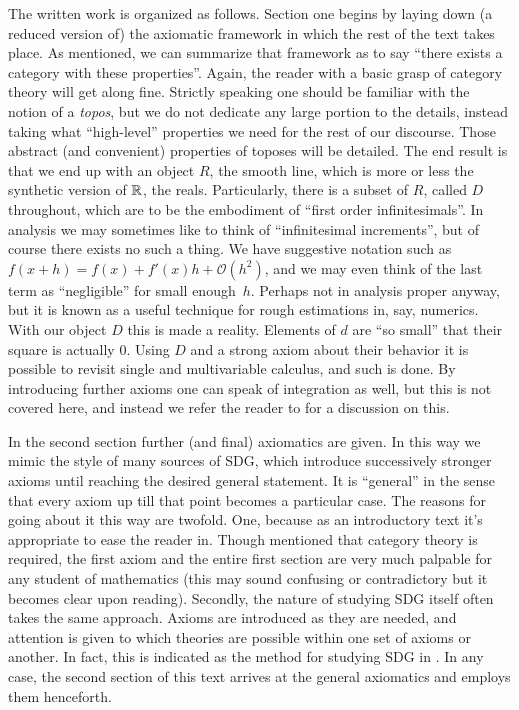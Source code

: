 The written work is organized as follows. Section one begins by laying down (a reduced version of) the axiomatic framework in which the rest of the text takes place. As mentioned, we can summarize that framework as to say ``there exists a category with these properties''. Again, the reader with a basic grasp of category theory will get along fine. Strictly speaking one should be familiar with the notion of a \emph{topos}, but we do not dedicate any large portion to the details, instead taking what ``high-level'' properties we need for the rest of our discourse. Those abstract (and convenient) properties of toposes will be detailed. The end result is that we end up with an object \( R \), the smooth line, which is more or less the synthetic version of \( \mathbb{R} \), the reals. Particularly, there is a subset of \( R \), called \( D \) throughout, which are to be the embodiment of ``first order infinitesimals''. In analysis we may sometimes like to think of ``infinitesimal increments'', but of course there exists no such a thing. We have suggestive notation such as \( f(x+h) = f(x) + f'(x)h + \mathcal O(h^2) \), and we may even think of the last term as ``negligible'' for small enough~\( h \). Perhaps not in analysis proper anyway, but it is known as a useful technique for rough estimations in, say, numerics. With our object \( D \) this is made a reality. Elements of \( d \) are ``so small'' that their square is actually \( 0 \). Using \( D \) and a strong axiom about their behavior it is possible to revisit single and multivariable calculus, and such is done. By introducing further axioms one can speak of integration as well, but this is not covered here, and instead we refer the reader to \cite{lav96} for a discussion on this.

In the second section further (and final) axiomatics are given. In this way we mimic the style of many sources of SDG, which introduce successively stronger axioms until reaching the desired general statement. It is ``general'' in the sense that every axiom up till that point becomes a particular case. The reasons for going about it this way are twofold. One, because as an introductory text it's appropriate to ease the reader in. Though mentioned that category theory is required, the first axiom and the entire first section are very much palpable for any student of mathematics (this may sound confusing or contradictory but it becomes clear upon reading). Secondly, the nature of studying SDG itself often takes the same approach. Axioms are introduced as they are needed, and attention is given to which theories are possible within one set of axioms or another. In fact, this is indicated as the method for studying SDG in \cite{bun17}. In any case, the second section of this text arrives at the general axiomatics and employs them henceforth.

